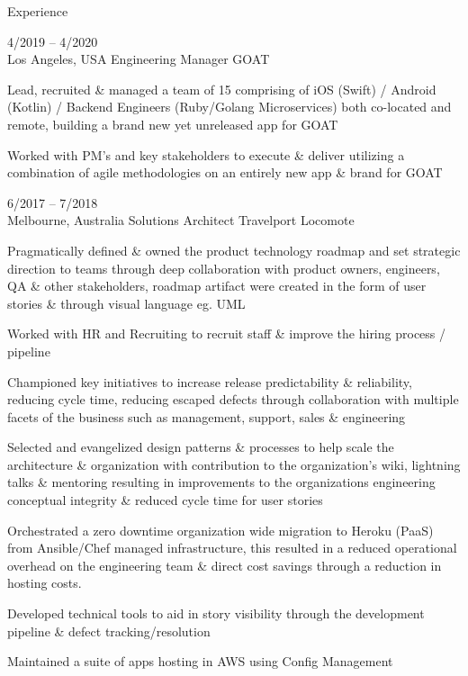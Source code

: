\documentclass[9pt]{developercv} %
\begin{document}
\begin{cvsect}{Experience}

  \begin{entrylist}
    \entry
      {4/2019 -- 4/2020\\\footnotesize{Los Angeles, USA}}
      {Engineering Manager}
      {GOAT}
      {Lead, recruited \& managed a team of 15 comprising of iOS (Swift) / Android
      (Kotlin) / Backend Engineers (Ruby/Golang Microservices)  both co-located
      and remote, building a brand new yet unreleased app for GOAT
      \par\medskip Worked with PM’s and key stakeholders to execute \& deliver utilizing a
      combination of agile methodologies on an entirely new app \& brand for GOAT}
    \entry
      {6/2017 -- 7/2018\\\footnotesize{Melbourne, Australia}}
      {Solutions Architect}
      {Travelport Locomote}
      {
      Pragmatically defined \& owned the product technology roadmap and set
      strategic direction to teams through deep collaboration with product owners,
      engineers, QA \& other stakeholders, roadmap artifact were created in the form of user stories \& through visual language eg. UML
      \par\medskip Worked with HR and Recruiting to recruit staff \& improve the hiring process / pipeline
      \par\medskip Championed key initiatives to increase release predictability \& reliability, reducing cycle time, reducing escaped defects through
      collaboration with multiple facets of the business such as management, support, sales \& engineering
  \par\medskip Selected and evangelized design patterns \& processes to help scale
    the architecture \& organization with contribution to the organization's wiki,
    lightning talks \& mentoring resulting in improvements to the organizations engineering conceptual integrity \& reduced cycle time for user stories
  \par\medskip Orchestrated a zero downtime organization wide migration to Heroku (PaaS) from Ansible/Chef managed infrastructure, this resulted in a reduced operational overhead on the engineering team \& direct cost savings through a reduction in hosting costs.
  \par\medskip Developed technical tools to aid in story visibility through the
      development pipeline \& defect tracking/resolution 
  \par\medskip Maintained a suite of apps hosting in AWS using Config Management
}
\end{entrylist}
\end{cvsect}
\end{document}

